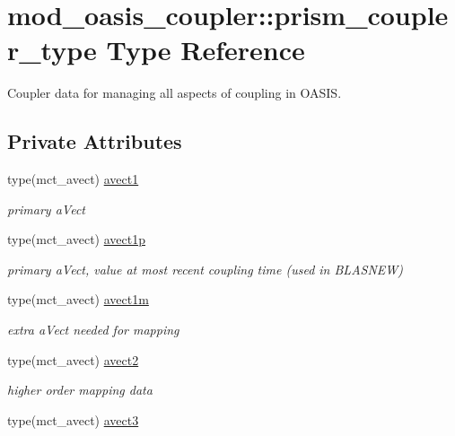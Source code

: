 \hypertarget{structmod__oasis__coupler_1_1prism__coupler__type}{}\section{mod\+\_\+oasis\+\_\+coupler\+:\+:prism\+\_\+coupler\+\_\+type Type Reference}
\label{structmod__oasis__coupler_1_1prism__coupler__type}


Coupler data for managing all aspects of coupling in O\+A\+S\+IS.  


\subsection*{Private Attributes}
\begin{DoxyCompactItemize}
\item 
type(mct\+\_\+avect) \hyperlink{structmod__oasis__coupler_1_1prism__coupler__type_a153e0bf9e28c0a8ff4d8bb27c83f598e}{avect1}
\begin{DoxyCompactList}\small\item\em primary a\+Vect \end{DoxyCompactList}\item 
type(mct\+\_\+avect) \hyperlink{structmod__oasis__coupler_1_1prism__coupler__type_ab93382323f7cce85d164dd94cf23b4e6}{avect1p}
\begin{DoxyCompactList}\small\item\em primary a\+Vect, value at most recent coupling time (used in B\+L\+A\+S\+N\+EW) \end{DoxyCompactList}\item 
type(mct\+\_\+avect) \hyperlink{structmod__oasis__coupler_1_1prism__coupler__type_ab5626722caee601622658134916f12bf}{avect1m}
\begin{DoxyCompactList}\small\item\em extra a\+Vect needed for mapping \end{DoxyCompactList}\item 
type(mct\+\_\+avect) \hyperlink{structmod__oasis__coupler_1_1prism__coupler__type_a7cd1aa8e520cf036f4dd72ad2445b774}{avect2}
\begin{DoxyCompactList}\small\item\em higher order mapping data \end{DoxyCompactList}\item 
type(mct\+\_\+avect) \hyperlink{structmod__oasis__coupler_1_1prism__coupler__type_ac923618471bb31902062be4107d9bbf3}{avect3}

\end{DoxyCompactItemize}
